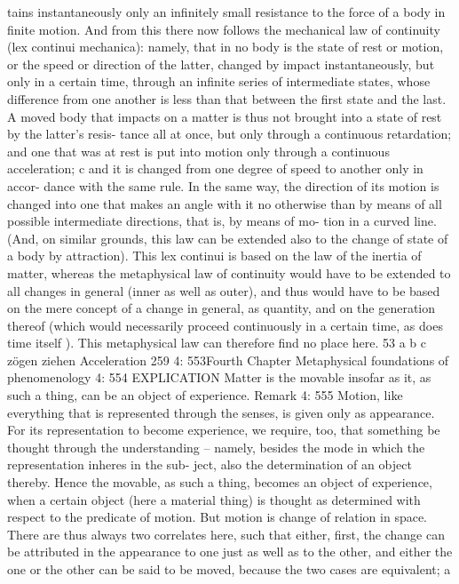 tains instantaneously only an inﬁnitely small resistance to the force of a
body in ﬁnite motion. And from this there now follows the mechanical
law of continuity (lex continui mechanica): namely, that in no body is the
state of rest or motion, or the speed or direction of the latter, changed
by impact instantaneously, but only in a certain time, through an inﬁnite
series of intermediate states, whose difference from one another is less
than that between the ﬁrst state and the last. A moved body that impacts
on a matter is thus not brought into a state of rest by the latter’s resis-
tance all at once, but only through a continuous retardation; and one that
was at rest is put into motion only through a continuous acceleration; c
and it is changed from one degree of speed to another only in accor-
dance with the same rule. In the same way, the direction of its motion
is changed into one that makes an angle with it no otherwise than by
means of all possible intermediate directions, that is, by means of mo-
tion in a curved line. (And, on similar grounds, this law can be extended
also to the change of state of a body by attraction). This lex continui is
based on the law of the inertia of matter, whereas the metaphysical law
of continuity would have to be extended to all changes in general (inner
as well as outer), and thus would have to be based on the mere concept
of a change in general, as quantity, and on the generation thereof (which
would necessarily proceed continuously in a certain time, as does time
itself ). This metaphysical law can therefore ﬁnd no place here. 53
a
b
c
zögen
ziehen
Acceleration
259
4: 553Fourth Chapter
Metaphysical foundations of phenomenology
4: 554
EXPLICATION
Matter is the movable insofar as it, as such a thing, can be an object of
experience.
Remark
4: 555
Motion, like everything that is represented through the senses, is given
only as appearance. For its representation to become experience, we
require, too, that something be thought through the understanding –
namely, besides the mode in which the representation inheres in the sub-
ject, also the determination of an object thereby. Hence the movable, as
such a thing, becomes an object of experience, when a certain object (here
a material thing) is thought as determined with respect to the predicate of
motion. But motion is change of relation in space. There are thus always
two correlates here, such that either, ﬁrst, the change can be attributed
in the appearance to one just as well as to the other, and either the one or
the other can be said to be moved, because the two cases are equivalent; a
